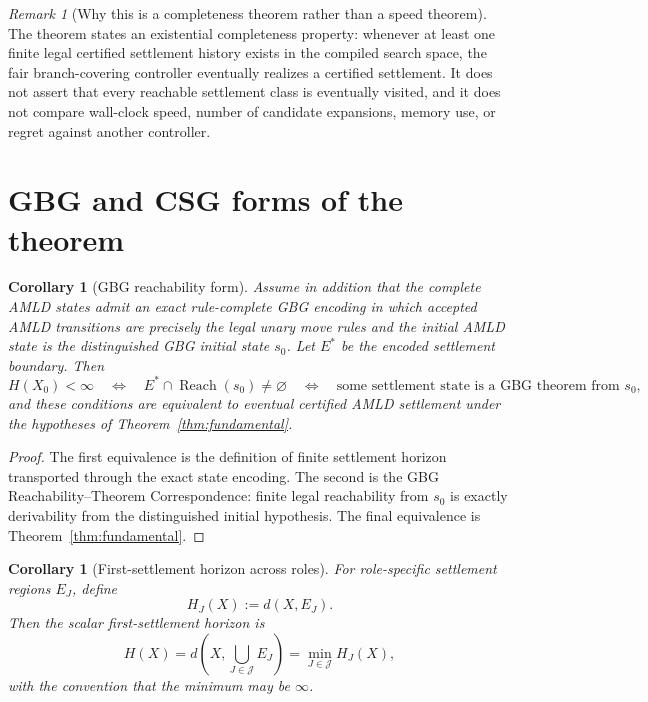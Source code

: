 \documentclass[11pt]{article}
\newtheorem{corollary}[definition]{Corollary}
\theoremstyle{remark}
\newtheorem{remark}[definition]{Remark}
\newcommand{\Reach}{\operatorname{Reach}}
\begin{document}
\begin{remark}[Why this is a completeness theorem rather than a speed theorem]
The theorem states an existential completeness property: whenever at least one finite legal certified settlement history exists in the compiled search space, the fair branch-covering controller eventually realizes a certified settlement.  It does not assert that every reachable settlement class is eventually visited, and it does not compare wall-clock speed, number of candidate expansions, memory use, or regret against another controller.
\end{remark}

\section{GBG and CSG forms of the theorem}

\begin{corollary}[GBG reachability form]\label{cor:gbg}
Assume in addition that the complete AMLD states admit an exact rule-complete GBG encoding in which accepted AMLD transitions are precisely the legal unary move rules and the initial AMLD state is the distinguished GBG initial state $s_0$.  Let $E^{\!*}$ be the encoded settlement boundary.  Then
\[
H(X_0)<\infty
\quad\Longleftrightarrow\quad
E^{\!*}\cap \Reach(s_0)\neq\varnothing
\quad\Longleftrightarrow\quad
\text{some settlement state is a GBG theorem from }s_0,
\]
and these conditions are equivalent to eventual certified AMLD settlement under the hypotheses of Theorem~\ref{thm:fundamental}.
\end{corollary}

\begin{proof}
The first equivalence is the definition of finite settlement horizon transported through the exact state encoding.  The second is the GBG Reachability--Theorem Correspondence: finite legal reachability from $s_0$ is exactly derivability from the distinguished initial hypothesis.  The final equivalence is Theorem~\ref{thm:fundamental}.
\end{proof}

\begin{corollary}[First-settlement horizon across roles]
For role-specific settlement regions $E_J$, define
\[
H_J(X):=d(X,E_J).
\]
Then the scalar first-settlement horizon is
\[
H(X)=d\!\left(X,\bigcup_{J\in\mathcal J}E_J\right)
     =\min_{J\in\mathcal J}H_J(X),
\]
with the convention that the minimum may be $\infty$.
\end{corollary}
\end{document}
